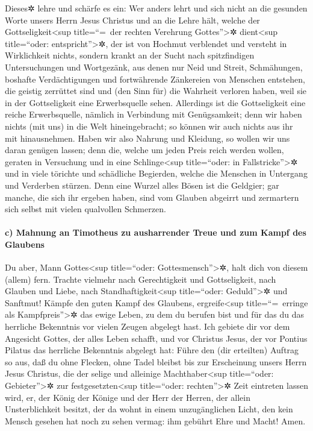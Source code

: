  Dieses✲ lehre und schärfe es ein: Wer anders lehrt und
sich nicht an die gesunden Worte unsers Herrn Jesus Christus und an die
Lehre hält, welche der Gottseligkeit\textless sup title=``=~der rechten
Verehrung Gottes''\textgreater✲ dient\textless sup title=``oder:
entspricht''\textgreater✲,  der ist von Hochmut verblendet
und versteht in Wirklichkeit nichts, sondern krankt an der Sucht nach
spitzfindigen Untersuchungen und Wortgezänk, aus denen nur Neid und
Streit, Schmähungen, boshafte Verdächtigungen  und
fortwährende Zänkereien von Menschen entstehen, die geistig zerrüttet
sind und (den Sinn für) die Wahrheit verloren haben, weil sie in der
Gottseligkeit eine Erwerbsquelle sehen.  Allerdings ist
die Gottseligkeit eine reiche Erwerbsquelle, nämlich in Verbindung mit
Genügsamkeit;  denn wir haben nichts (mit uns) in die Welt
hineingebracht; so können wir auch nichts aus ihr mit hinausnehmen.
 Haben wir also Nahrung und Kleidung, so wollen wir uns
daran genügen lassen;  denn die, welche um jeden Preis
reich werden wollen, geraten in Versuchung und in eine
Schlinge\textless sup title=``oder: in Fallstricke''\textgreater✲ und in
viele törichte und schädliche Begierden, welche die Menschen in
Untergang und Verderben stürzen.  Denn eine Wurzel alles
Bösen ist die Geldgier; gar manche, die sich ihr ergeben haben, sind vom
Glauben abgeirrt und zermartern sich selbst mit vielen qualvollen
Schmerzen.

\hypertarget{c-mahnung-an-timotheus-zu-ausharrender-treue-und-zum-kampf-des-glaubens}{%
\paragraph{c) Mahnung an Timotheus zu ausharrender Treue und zum Kampf
des
Glaubens}\label{c-mahnung-an-timotheus-zu-ausharrender-treue-und-zum-kampf-des-glaubens}}

 Du aber, Mann Gottes\textless sup title=``oder:
Gottesmensch''\textgreater✲, halt dich von diesem (allem) fern. Trachte
vielmehr nach Gerechtigkeit und Gottseligkeit, nach Glauben und Liebe,
nach Standhaftigkeit\textless sup title=``oder: Geduld''\textgreater✲
und Sanftmut!  Kämpfe den guten Kampf des Glaubens,
ergreife\textless sup title=``=~erringe als Kampfpreis''\textgreater✲
das ewige Leben, zu dem du berufen bist und für das du das herrliche
Bekenntnis vor vielen Zeugen abgelegt hast.  Ich gebiete
dir vor dem Angesicht Gottes, der alles Leben schafft, und vor Christus
Jesus, der vor Pontius Pilatus das herrliche Bekenntnis abgelegt hat:
 Führe den (dir erteilten) Auftrag so aus, daß du ohne
Flecken, ohne Tadel bleibst bis zur Erscheinung unsers Herrn Jesus
Christus,  die der selige und alleinige
Machthaber\textless sup title=``oder: Gebieter''\textgreater✲ zur
festgesetzten\textless sup title=``oder: rechten''\textgreater✲ Zeit
eintreten lassen wird, er, der König der Könige und der Herr der Herren,
 der allein Unsterblichkeit besitzt, der da wohnt in
einem unzugänglichen Licht, den kein Mensch gesehen hat noch zu sehen
vermag: ihm gebührt Ehre und Macht! Amen.

